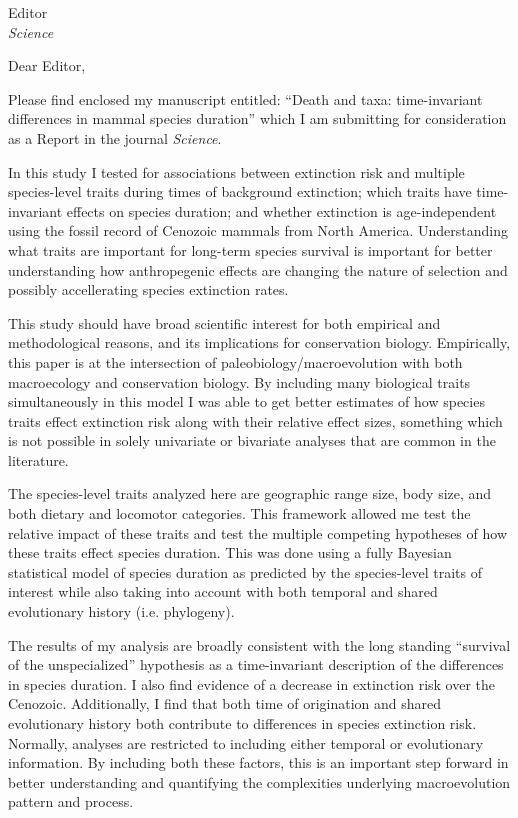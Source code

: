 \documentclass{letter}
\begin{document}
\begin{letter}{Editor \\ \textit{Science}}
  \opening{Dear Editor,}

  Please find enclosed my manuscript entitled: ``Death and taxa: time-invariant differences in mammal species duration'' which I am submitting for consideration as a Report in the journal \textit{Science}.

  In this study I tested for associations between extinction risk and multiple species-level traits during times of background extinction; which traits have time-invariant effects on species duration; and whether extinction is age-independent using the fossil record of Cenozoic mammals from North America. Understanding what traits are important for long-term species survival is important for better understanding how anthropegenic effects are changing the nature of selection and possibly accellerating species extinction rates.

  This study should have broad scientific interest for both empirical and methodological reasons, and its implications for conservation biology. Empirically, this paper is at the intersection of paleobiology/macroevolution with both macroecology and conservation biology. By including many biological traits simultaneously in this model I was able to get better estimates of how species traits effect extinction risk along with their relative effect sizes, something which is not possible in solely univariate or bivariate analyses that are common in the literature. 
  
  The species-level traits analyzed here are geographic range size, body size, and both dietary and locomotor categories. This framework allowed me test the relative impact of these traits and test the multiple competing hypotheses of how these traits effect species duration. This was done using a fully Bayesian statistical model of species duration as predicted by the species-level traits of interest while also taking into account with both temporal and shared evolutionary history (i.e. phylogeny). 
  
  The results of my analysis are broadly consistent with the long standing ``survival of the unspecialized'' hypothesis as a time-invariant description of the differences in species duration. I also find evidence of a decrease in extinction risk over the Cenozoic. Additionally, I find that both time of origination and shared evolutionary history both contribute to differences in species extinction risk. Normally, analyses are restricted to including either temporal or evolutionary information. By including both these factors, this is an important step forward in better understanding and quantifying the complexities underlying macroevolution pattern and process.
  

\end{letter}
\end{document}
